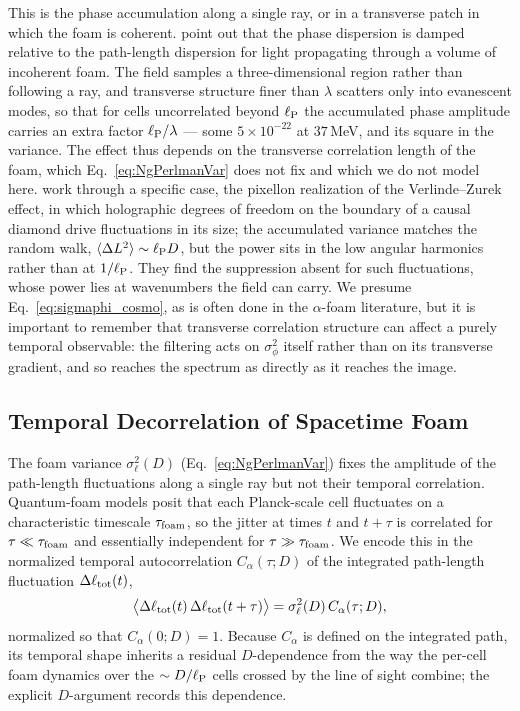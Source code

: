 \documentclass[aps,prd,onecolumn,amsmath,amssymb]{revtex4-2}
\begin{document}
This is the phase accumulation along a single ray, or in a transverse patch in which the foam
is coherent.
\citet{ChenWenMa2014} point out that the phase dispersion is damped relative
to the path-length dispersion for light propagating through a volume of
incoherent foam.  The field samples a three-dimensional region rather than
following a ray, and transverse structure finer than $\lambda$ scatters only
into evanescent modes, so that for cells uncorrelated beyond $\ell_{\rm P}$
the accumulated phase amplitude carries an extra factor
$\ell_{\rm P}/\lambda$ --- some $5\times10^{-22}$ at $37$\,MeV, and its
square in the variance.  The effect thus depends on the transverse
correlation length of the foam, which
Eq.~\eqref{eq:NgPerlmanVar} does not fix and which we do not model here.
\citet{LeeZurekChen2024} work through a specific case, the pixellon
realization of the Verlinde--Zurek effect, in which holographic degrees of
freedom on the boundary of a causal diamond drive fluctuations in its size;
the accumulated variance matches the random walk, $\langle\Delta L^2\rangle
\sim\ell_{\rm P}D$, but the power sits in the low angular harmonics rather
than at $1/\ell_{\rm P}$.  They find the suppression absent for such
fluctuations, whose power lies at wavenumbers the field can carry.  We presume
Eq.~\eqref{eq:sigmaphi_cosmo}, as is often done in the $\alpha$-foam literature,
but it is important to remember
that transverse correlation structure can affect a purely temporal
observable: the filtering acts on $\sigma_\phi^2$ itself rather than
on its transverse gradient, and so reaches the spectrum as directly as it
reaches the image.

\subsection{Temporal Decorrelation of Spacetime Foam}
\label{sec:Calpha_origin}

The foam variance $\sigma_\ell^2(D)$ (Eq.~\eqref{eq:NgPerlmanVar})
fixes the amplitude of the path-length fluctuations along a single
ray but not their temporal correlation.  Quantum-foam models posit
that each Planck-scale cell fluctuates on a characteristic timescale
$\tau_{\rm foam}$, so the jitter at times $t$ and $t+\tau$ is correlated
for $\tau\ll\tau_{\rm foam}$ and essentially independent for
$\tau\gg\tau_{\rm foam}$.  We encode this in the normalized temporal
autocorrelation $C_\alpha(\tau;D)$ of the integrated path-length
fluctuation $\Delta\ell_{\rm tot}(t)$,
\begin{equation}
  \big\langle \Delta\ell_{\rm tot}(t)\,
              \Delta\ell_{\rm tot}(t+\tau) \big\rangle
  = \sigma_\ell^2(D)\,C_\alpha(\tau;D),
  \label{eq:pathcov1ray}
\end{equation}
normalized so that $C_\alpha(0;D)=1$.  Because $C_\alpha$ is defined on
the integrated path, its temporal shape inherits a residual
$D$-dependence from the way the per-cell foam dynamics over the
$\sim D/\ell_{\rm P}$ cells crossed by the line of sight combine; the
explicit $D$-argument records this dependence.
\end{document}
